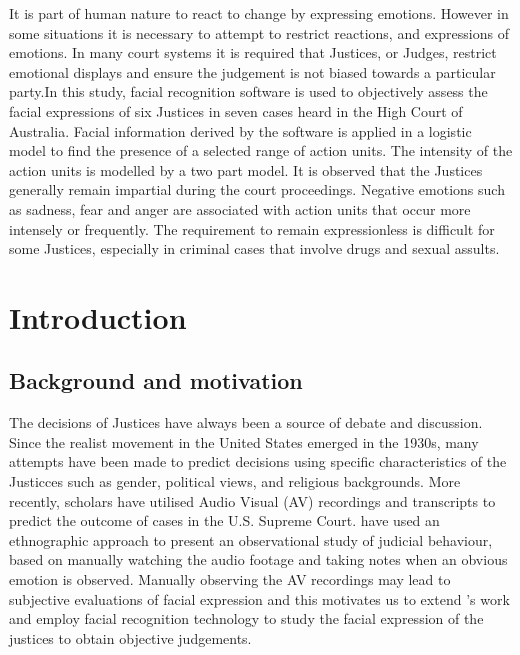 \documentclass{monashthesis}
\begin{document}
It is part of human nature to react to change by expressing emotions. However in some situations it is necessary to attempt to restrict reactions, and expressions of emotions.
In many court systems it is required that Justices, or Judges, restrict emotional displays and ensure the judgement is not biased towards a particular party.In this study, facial recognition software is used to objectively assess the facial expressions of six Justices in seven cases heard in the High Court of Australia. Facial information derived by the software is applied in a logistic model to find the presence of a selected range of action units. The intensity of the action units is modelled by a two part model. It is observed that the Justices generally remain impartial during the court proceedings. Negative emotions such as sadness, fear and anger are associated with action units that occur more intensely or frequently. The requirement to remain expressionless is difficult for some Justices, especially in criminal cases that involve drugs and sexual assults.

\clearpage{}\setcounter{page}{1}
\let\cleardoublepage\clearpage

\hypertarget{ch:intro}{%
\chapter{Introduction}\label{ch:intro}}

\hypertarget{background-and-motivation}{%
\section{Background and motivation}\label{background-and-motivation}}

The decisions of Justices have always been a source of debate and discussion. Since the realist movement in the United States emerged in the 1930s, many attempts have been made to predict decisions using specific characteristics of the Justicces such as gender, political views, and religious backgrounds. More recently, scholars \autocites{Shullman2004illusion}{chen2018justice} have utilised Audio Visual (AV) recordings and transcripts to predict the outcome of cases in the U.S. Supreme Court. \textcite{tutton2018judicial} have used an ethnographic approach to present an observational study of judicial behaviour, based on manually watching the audio footage and taking notes when an obvious emotion is observed. Manually observing the AV recordings may lead to subjective evaluations of facial expression and this motivates us to extend \textcite{tutton2018judicial}'s work and employ facial recognition technology to study the facial expression of the justices to obtain objective judgements.
\end{document}
